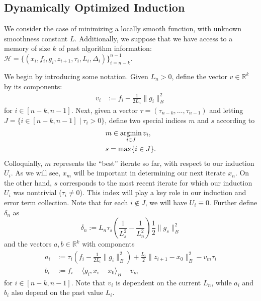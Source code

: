 \documentclass[11pt]{article}
\numberwithin{equation}{section}
\newcommand{\argmin}{\operatornamewithlimits{argmin}}
\newcommand{\R}{\mathbb{R}}
\newcommand{\Mem}{\mathcal{H}}
\newcommand{\MemExpr}{\{(x_i, f_i, g_i, z_{i+1}, \tau_i, L_i, \Delta_i)\}_{i=n-\idxMem}^{n-1}}
\newcommand{\idxArgmin}{m}
\newcommand{\idxLastSuccess}{s}
\newcommand{\idxMem}{k}
\newcommand{\idxSetSuccess}{J}
\newcommand{\dotB}[2]{\langle {#1}, {#2} \rangle_B}
\newcommand{\normB}[1]{\|{#1}\|_B}
\newcommand{\deltaExpr}{L_n \tau_\idxLastSuccess\left(\frac{1}{L_\idxLastSuccess^2} - \frac{1}{L_n^2}\right) \frac{1}{2}\normB{g_\idxLastSuccess}^2}
\theoremstyle{definition}
\theoremstyle{plain}
\theoremstyle{definition}
\begin{document}
\subsection{Dynamically Optimized Induction} \label{SubSec:Dynamic}

We consider the case of minimizing a locally smooth function, with unknown smoothness constant $L$. Additionally, we suppose that we have access to a memory of size $\idxMem$ of past algorithm information: $\Mem = \MemExpr$.

We begin by introducing some notation. Given $L_n > 0$, define the vector $v \in \R^\idxMem$ by its components:
\begin{align} \label{Eqn:Def_hwv}
    v_i & := f_i - \frac{1}{2L_n}\normB{g_i}^2
\end{align}
for $i \in [n-\idxMem, n-1]$.
Next, given a vector $\tau = (\tau_{n-\idxMem}, \dots, \tau_{n-1})$ and letting $\idxSetSuccess = \{i \in [n-\idxMem, n-1] \mid \tau_i > 0\}$, define two special indices $\idxArgmin$ and $\idxLastSuccess$ according to
\begin{align} 
    & \idxArgmin \in \argmin_{i \in \idxSetSuccess} v_i \label{Eqn:Def_idx_m}, \\
    & \idxLastSuccess = \max\{i \in \idxSetSuccess\} \label{Eqn:Def_idx_s} .
\end{align}
Colloquially, $\idxArgmin$ represents the ``best'' iterate so far, with respect to our induction $U_i$. As we will see, $x_\idxArgmin$ will be important in determining our next iterate $x_n$. On the other hand, $\idxLastSuccess$ corresponds to the most recent iterate for which our induction $U_i$ was nontrivial ($\tau_i\neq 0$). This index will play a key role in our induction and error term collection. Note that for each $i\not\in \idxSetSuccess$, we will have $U_i \equiv 0$. Further define $\delta_n$ as
\begin{equation}\label{Eqn:deltaExpr}
    \delta_n := \deltaExpr
\end{equation}
and the vectors $a,b \in \R^\idxMem$ with components
\begin{align}
    a_i & := \tau_i(f_i - \frac{1}{2L_i}\normB{g_i}^2) + \frac{L_i}{2}\normB{z_{i+1} - x_0}^2 - v_m \tau_i \\
    b_i & := f_i - \dotB{g_i}{x_i - x_0} - v_m
\end{align}
for $i\in[n-k,n-1]$.
Note that $v_i$ is dependent on the current $L_n$, while $a_i$ and $b_i$ also depend on the past value $L_i$.
\end{document}
